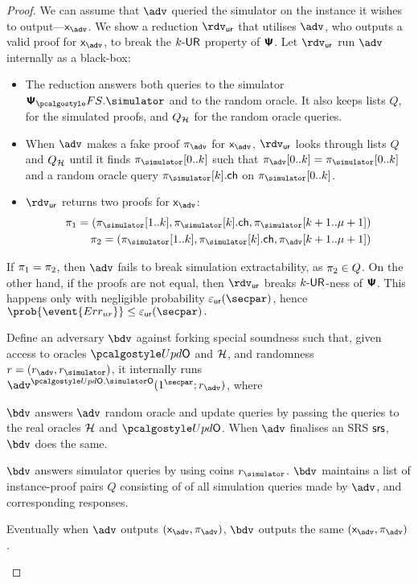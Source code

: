 \begin{proof}
{  We can assume that $\advse$ queried the simulator on the instance it wishes to
  output---$\inp_{\advse}$. We show a reduction $\rdvur$ that utilises $\advse$,
  who outputs a valid proof for $\inp_{\advse}$, to break the ${k\text{-}\mathsf{UR}}$ property of
  $\bm{\mathsf{\Psi}}$. Let $\rdvur$ run $\advse$ internally as a black-box:
\begin{itemize}
	\item The reduction answers both queries to the simulator $\psfs.\simulator$ and to the random oracle. 
	It also keeps lists $Q$, for the simulated proofs, and $Q_{\mathcal{H}}$ for the random oracle queries. 
\item When $\advse$ makes a fake proof $\zkproof_{\advse}$ for $\inp_{\advse}$,
  $\rdvur$ looks through lists $Q$ and $Q_{\mathcal{H}}$ until it finds
  $\zkproof_{\simulator}[0..k]$ such that
  $\zkproof_{\advse}[0..k] = \zkproof_{\simulator}[0..k]$
  and a random oracle query $\zkproof_{\simulator}[k].\ch$ on
  $\zkproof_{\simulator}[0..k]$.
	\item $\rdvur$ returns two proofs for $\inp_{\advse}$:
	\begin{align*}
		\zkproof_1 = (\zkproof_{\simulator}[1..k],
		\zkproof_{\simulator}[k].\ch, \zkproof_{\simulator}[k + 1..\mu + 1])\\
		\zkproof_2 = (\zkproof_{\simulator}[1..k],
		\zkproof_{\simulator}[k].\ch, \zkproof_{\advse}[k + 1..\mu + 1])
	\end{align*}
	\end{itemize}  
	If $\pi_1 = \pi_2$, then $\advse$ fails to break simulation
  extractability, as $\pi_2 \in Q$. On the other hand, if the proofs are
  not equal, then $\rdvur$ breaks ${k\text{-}\mathsf{UR}}$-ness of $\bm{\mathsf{\Psi}}$. This happens only with
  negligible probability $\epsur(\secpar)$, hence \( \prob{\event{\errur}} \leq
  \epsur(\secpar)\,. \)
}
%
 Define an adversary $\bdv$ against forking special soundness such that,
given access to oracles $\initU$ and $\mathcal{H}$, and randomness $r = (r_\adv, \rsim)$, it
internally runs $\advse^{\initU, \simO} (1^\secpar; r_\adv)$, where
\begin{compactenum}
\item $\bdv$ answers $\adv$ random oracle and update queries by passing the queries to the real
  oracles $\mathcal{H}$ and $\initU$. When $\adv$ finalises an SRS $\mathsf{srs}$, $\bdv$ does the same.
\item $\bdv$ answers simulator queries by using coins $\rsim$. $\bdv$ maintains a
  list of instance-proof pairs $Q$ consisting of of all simulation queries made by
  $\adv$, and corresponding responses.
\item Eventually when $\adv$ outputs $(\inp_\advse, \zkproof_\advse)$, $\bdv$ outputs
  the same $(\inp_\advse, \zkproof_\advse)$.
\end{compactenum}


\end{proof}
